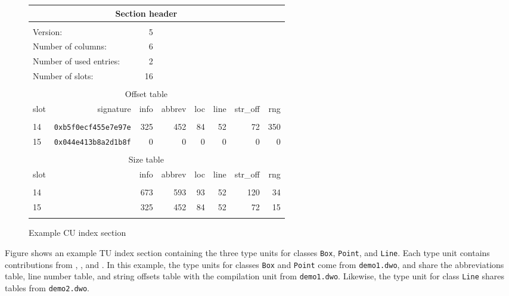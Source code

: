 \begin{figure}[ht]
\begin{center}
\begin{tabular}{lrrrrrrr}
\\
  \multicolumn{7}{c}{Section header} \\
\hline \\
  \multicolumn{2}{l}{Version:}&                 5  &&&&&\\
  \multicolumn{2}{l}{Number of columns:}&       6  &&&&&\\
  \multicolumn{2}{l}{Number of used entries:}&  2  &&&&&\\
  \multicolumn{2}{l}{Number of slots:}&         16 &&&&&\\
\\
  \multicolumn{7}{c}{Offset table} \\
  \hline
  slot&  signature&                       info&   abbrev&      loc&     line& str\_off&    rng \\ \\
    14& \texttt{0xb5f0ecf455e7e97e} &      325&      452&       84&       52&       72&    350 \\
    15& \texttt{0x044e413b8a2d1b8f} &        0&        0&        0&        0&        0&      0 \\
\\
  \multicolumn{7}{c}{Size table} \\
  \hline
  slot&                    &     info&   abbrev&      loc&     line& str\_off&    rng \\ \\
    14&                    &      673&      593&       93&       52&      120&     34 \\
    15&                    &      325&      452&       84&       52&       72&     15 \\
\\ \hline 
\end{tabular}
\end{center}
\caption{Example CU index section}
\label{fig:examplecuindexsection}
\end{figure}

Figure  
shows an example TU index section containing the
three type units for classes \texttt{Box}, \texttt{Point}, and 
\texttt{Line}. Each type unit
contains contributions from \dotdebuginfodwo{}, \dotdebugabbrevdwo{},
\dotdebuglinedwo{} and \dotdebugstroffsetsdwo{}. In this example, the
type units for classes \texttt{Box} and \texttt{Point} come from 
\texttt{demo1.dwo}, and
share the abbreviations table, line number table, and string
offsets table with the compilation unit from \texttt{demo1.dwo}. 
Likewise, the type unit for class \texttt{Line} shares tables 
from \texttt{demo2.dwo}. 

